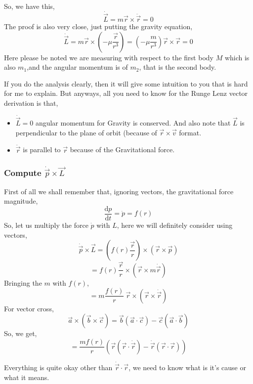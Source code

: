 \documentclass[11pt,a4paper]{article}
\begin{document}
So, we have this,
\[ 
\dot{\vec{L}} = m \vec{r} \times \ddot{\vec{r}} = 0
\] 
The proof is also very close, just putting the gravity equation,
\[ 
    \dot{\vec{L}} = m \vec{r} \times  \left( - \mu \frac{\vec{r}}{r^3} \right) 
    = \left( - \mu \frac{m}{r^3} \right) \vec{r} \times  \vec{r} = 0
\] 
Here please be noted we are measuring with respect to the first body $M$ which is also $m_1$,and the angular momentum is of $m_2$, that is the second body. 

If you do the analysis clearly, then it will give some intuition to you that is hard for me to explain. But anyways, all you need to know for the Runge Lenz vector derivation is that,
\begin{itemize}
    \item $ \dot{\vec{L}} = 0$ angular momentum for Gravity is conserved. And also note that $\vec{L}$ is perpendicular to the plane of orbit (because of $\vec{r} \times  \vec{v}$ format.
    \item $ \ddot{\vec{r}} $ is parallel to $\vec{r}$ because of the Gravitational force.
\end{itemize}

\subsubsection{ Compute $ \dot{\vec{p}} \times  \vec{L} $ }
First of all we shall remember that, ignoring vectors, the gravitational force magnitude,
\[ 
    \frac{\mathrm{d} p}{\mathrm{d} t} = \dot{p} = f\left( r \right) 
\]
So, let us multiply the force $ \dot{p}$ with $L$, here we will definitely consider using vectors,
\[ 
    \dot{\vec{p}} \times  \vec{L} = \left( f(r) \frac{\vec{r}}{r} \right) \times  \left( \vec{r} \times  \vec{p} \right) 
\]
\[ 
    = f(r) \frac{\vec{r}}{r} \times  \left( \vec{r} \times  m \dot{\vec{r}} \right) 
\]
Bringing the $m$ with $f(r)$,
\[ 
    = m \frac{f(r)}{r} \ \vec{r} \times \left( \vec{r} \times  \dot{\vec{r}} \right) 
\]
For vector cross, 
\[ 
    \vec{a} \times  \left( \vec{b} \times  \vec{c} \right) = \vec{b} \left( \vec{a}\cdot \vec{c} \right) - \vec{c} \left( \vec{a}\cdot \vec{b} \right) 
\]
So, we get,
\[ 
    = \frac{m f(r)}{r} \left( \vec{r} \left( \vec{r} \cdot  \dot{\vec{r}} \right) - \dot{\vec{r}} \left( \vec{r}\cdot  \vec{r} \right)  \right) 
\]

Everything is quite okay other than $ \dot{\vec{r}} \cdot  \vec{r}$, we need to know what is it's cause or what it means.
\end{document}
